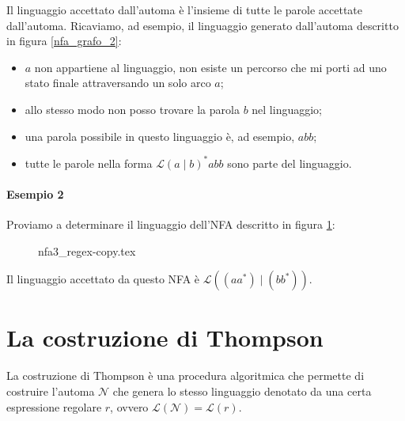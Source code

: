 \documentclass[class=book, crop=false, oneside, 12pt]{standalone}
\begin{document}
Il linguaggio accettato dall’automa è l’insieme di tutte le parole accettate dall’automa.
Ricaviamo, ad esempio, il linguaggio generato dall’automa descritto in figura \ref{nfa_grafo_2}:
\begin{itemize}
    \item \(a\) non appartiene al linguaggio, non esiste un percorso che mi porti ad uno stato finale attraversando un solo arco \(a\);
    \item allo stesso modo non posso trovare la parola \(b\) nel linguaggio;
    \item una parola possibile in questo linguaggio è, ad esempio, \(abb\);
    \item tutte le parole nella forma \(\mathcal{L}(a \mid b)^\ast abb\) sono parte del linguaggio.
\end{itemize}

\paragraph{Esempio 2}
Proviamo a determinare il linguaggio dell'NFA descritto in figura \ref{nfa_grafo_3}:

\begin{figure}[htb]
    \centering
    {nfa3_regex-copy.tex}
    \caption{}
    \label{nfa_grafo_3}
\end{figure}

\noindent Il linguaggio accettato da questo NFA è \(\mathcal{L}((a a^* ) \mid ( b b^\ast ))\).

\section{La costruzione di Thompson}
La costruzione di Thompson è una procedura algoritmica che permette di costruire l’automa \(\mathcal{N}\) che genera lo stesso linguaggio denotato da una certa espressione regolare \(r\), ovvero \(\mathcal{L}(\mathcal{N}) = \mathcal{L}(r)\).
\end{document}
